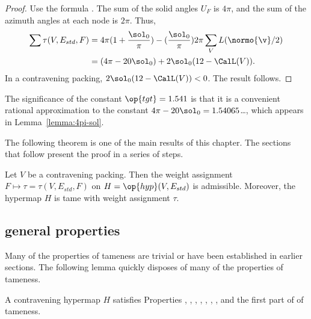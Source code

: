 \begin{proof}
Use the formula .
  The sum of the solid angles $U_F$ is $4\pi$, and the sum of the azimuth
  angles at each node is $2\pi$.
Thus,
\begin{align*}\label{eqn:delta0}
  \sum \tau (V,E_{std},F) 
  &= 4\pi (1 + \dfrac{\sol_0}{\pi}) 
- (\dfrac{\sol_0}{\pi}) 2\pi \sum_{V} L(\normo{\v}/2)\vspace{6pt}\\
&= (4\pi - 20\sol_0) + 2\sol_0 (12 - \CalL(V)).
\end{align*}
In a contravening packing, $2\sol_0(12-\CalL(V))<0$.
The result follows.
\end{proof}

The significance of the constant $\op{tgt}=1.541$ is that it is a
convenient rational approximation to the constant $4\pi -
20\sol_0=1.54065$\dots, which appears in Lemma~\ref{lemma:4pi-sol}.
%

The following theorem is one of the main results of this chapter.  The
sections that follow present the proof in a series of steps.

\begin{theorem} \label{theorem:contravene}
  Let $V$ be a contravening packing.  Then the weight assignment
  $F\mapsto\tau=\tau(V,E_{std},F)$ on $H=\op{hyp}(V,E_{std})$ is
  admissible.  Moreover, the hypermap $H$ is tame with weight
  assignment $\tau$.
\end{theorem}
%
%
%



\subsection{general properties}
\label{sec:startame}


Many of the properties of tameness are trivial or have been
established in earlier sections.  The following lemma quickly disposes
of many of the properties of tameness.

\begin{lemma}[]\label{lemma:multi}
  A contravening hypermap $H$ satisfies Properties ,
  , , , , , , and the first
  part of 
of tameness.
\end{lemma}

